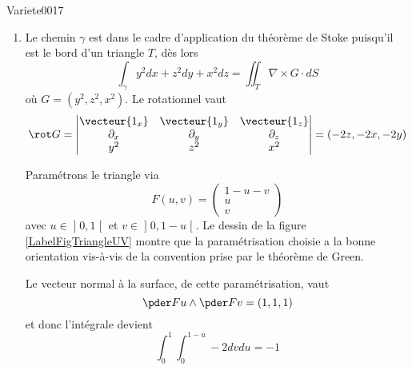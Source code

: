 
\begin{corrige}{Variete0017}


	\begin{enumerate}

		\item

			Le chemin $\gamma$ est dans le cadre d'application du théorème de Stoke puisqu'il est le bord d'un triangle $T$, dès lors
			\begin{equation*}
				\int_{\gamma} y^2 d x + z^2 d y + x^2 d z = \iint_T \nabla\times G \cdot dS
			\end{equation*}
			où $G = (y^2, z^2, x^2)$. Le rotationnel vaut
			\begin{equation*}
				\rot G =
				\begin{vmatrix}
					\vecteur{1_x} & \vecteur{1_y} & \vecteur{1_z}\\
					\partial_x & \partial_y & \partial_z \\
					y^2 & z^2 & x^2
				\end{vmatrix}
				= (-2 z, -2 x, - 2 y)
			\end{equation*}

			Paramétrons le triangle via
			\begin{equation}
				F(u,v)=\begin{pmatrix}
					1-u-v	\\ 
					u	\\ 
					v	
				\end{pmatrix}
			\end{equation}
			avec $u\in\mathopen] 0 , 1 \mathclose[$ et $v\in\mathopen] 0 , 1-u \mathclose[$. Le dessin de la figure \ref{LabelFigTriangleUV} montre que la paramétrisation choisie a la bonne orientation vis-à-vis de la convention prise par le théorème de Green.
			\newcommand{\CaptionFigTriangleUV}{Question d'orientation. La base $(\nu,T)$ a la même orientation que la base $(1_u,1_v)$. Cela fait que la carte choisie est de bonne orientation.}
			

			Le vecteur normal à la surface, de cette paramétrisation, vaut
			\begin{equation*}
				\pder F u \wedge \pder F v = (1,1,1)
			\end{equation*}
			et donc l'intégrale devient
			\begin{equation*}
				\int_0^1 \int_0^{1-u} -2 d v d u = -1
			\end{equation*}


\end{enumerate}
\end{corrige}
